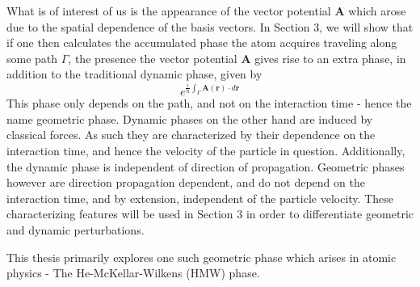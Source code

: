 What is of interest of us is the appearance of the vector potential $\mathbf{A}$ which arose due to the spatial dependence of the basis vectors. In Section 3, we will show that if one then calculates the accumulated phase the atom acquires traveling along some path $\Gamma$, the presence the vector potential $\mathbf{A}$ gives rise to an extra phase, in addition to the traditional dynamic phase, given by 
\begin{equation}
e^{\frac{i}{\hbar}\int_{\Gamma} \mathbf{A}(\mathbf{r})\cdot d\mathbf{r}}
\end{equation}
This phase only depends on the path, and not on the interaction time - hence the name geometric phase. Dynamic phases on the other hand are induced by classical forces.  As such they are characterized by their dependence on the interaction time, and hence the velocity of the particle in question.  Additionally, the dynamic phase is independent of direction of propagation. Geometric phases however are direction propagation dependent, and do not depend on the interaction time, and by extension, independent of the particle velocity.  These characterizing features will be used in Section 3 in order to differentiate geometric and dynamic perturbations.

\vspace{5mm}

This thesis primarily explores one such geometric phase which arises in atomic physics - The He-McKellar-Wilkens (HMW) phase. 

\vspace{5mm}

